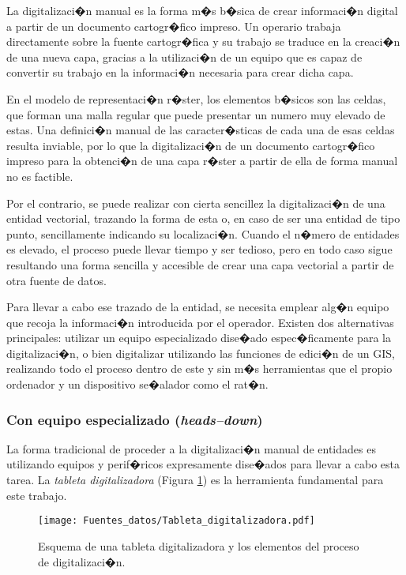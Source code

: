 La digitalizaci�n manual es la forma m�s b�sica de crear informaci�n digital a partir de un documento cartogr�fico impreso. Un operario trabaja directamente sobre la fuente cartogr�fica y su trabajo se traduce en la creaci�n de una nueva capa, gracias a la utilizaci�n de un equipo que es capaz de convertir su trabajo en la informaci�n necesaria para crear dicha capa.

En el modelo de representaci�n r�ster, los elementos b�sicos son las celdas, que forman una malla regular que puede presentar un numero muy elevado de estas. Una definici�n manual de las caracter�sticas de cada una de esas celdas resulta inviable, por lo que la digitalizaci�n de un documento cartogr�fico impreso para la obtenci�n de una capa r�ster a partir de ella de forma manual no es factible.

Por el contrario, se puede realizar con cierta sencillez la digitalizaci�n de una entidad vectorial, trazando la forma de esta o, en caso de ser una entidad de tipo punto, sencillamente indicando su localizaci�n. Cuando el n�mero de entidades es elevado, el proceso puede llevar tiempo y ser tedioso, pero en todo caso sigue resultando una forma sencilla y accesible de crear una capa vectorial a partir de otra fuente de datos.

Para llevar a cabo ese trazado de la entidad, se necesita emplear alg�n equipo que recoja la informaci�n introducida por el operador. Existen dos alternativas principales: utilizar un equipo especializado dise�ado espec�ficamente para la digitalizaci�n, o bien digitalizar utilizando las funciones de edici�n de un GIS, realizando todo el proceso dentro de este y sin m�s herramientas que el propio ordenador y un dispositivo se�alador como el rat�n.

\subsubsection{Con equipo especializado (\emph{heads--down})} \label{heads-down}


La forma tradicional de proceder a la digitalizaci�n manual de entidades es utilizando equipos y perif�ricos expresamente dise�ados para llevar a cabo esta tarea. La \emph{tableta digitalizadora} (Figura \ref{Fig:Tableta_digitalizadora}) es la herramienta fundamental para este trabajo.

\begin{figure}[!hbt]   
\centering
\texttt{[image: Fuentes\_datos/Tableta\_digitalizadora.pdf]}
\caption{\small Esquema de una tableta digitalizadora y los elementos del proceso de digitalizaci�n.}
\label{Fig:Tableta_digitalizadora} 
\end{figure}

